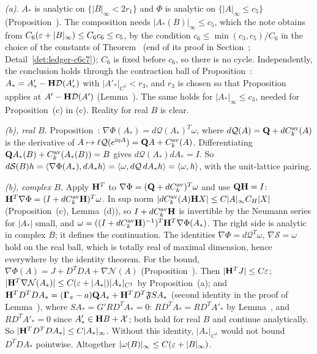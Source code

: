 \begin{detail}\label{d7:coarse}
\begin{step}
\emph{(a).} $A_*$ is analytic on $\{|B|_\infty<2r_1\}$ and $\Phi$ is analytic on $\{|A|_\infty\le c_5\}$ (Proposition~). The composition needs $|A_*(B)|_\infty\le c_5$, which the note obtains from $C_6(\varepsilon+|B|_\infty)\le C_6c_6\le c_5$, by the condition $c_6\le\min(c_3,c_5)/C_6$ in the choice of the constants of Theorem~ (end of its proof in Section~; Detail~\ref{det:ledger-c6c7}); $C_6$ is fixed before $c_6$, so there is no cycle. Independently, the conclusion holds through the contraction ball of Proposition~: $A_*=A'_*-\mathbf H\mathcal D(A'_*)$ with $|A'_*|_{C^1}<r_3$, and $r_3$ is chosen so that Proposition~ applies at $A'-\mathbf H\mathcal D(A')$ (Lemma~). The same holds for $|A_*|_\infty\le c_3$, needed for Proposition~(c) in (c). Reality for real $B$ is clear.
\end{step}
\begin{step}
\emph{(b), real $B$.} Proposition~: $\nabla\Phi(A_*)=d\mathcal Q(A_*)^T\omega$, where $d\mathcal Q(A)=\mathbf Q+dC^{\rm av}_k(A)$ is the derivative of $A\mapsto\ell\mathcal Q(e^{\mathrm i\eta A})=\mathbf Q A+C^{\rm av}_k(A)$. Differentiating $\mathbf Q A_*(B)+C^{\rm av}_k(A_*(B))=B$ gives $d\mathcal Q(A_*)dA_*=I$. So $d\mathcal S(B)h=\langle \nabla\Phi(A_*),dA_*h\rangle=\langle \omega,d\mathcal Q\,dA_*h\rangle=\langle \omega,h\rangle$, with the unit-lattice pairing.
\end{step}
\begin{step}
\emph{(b), complex $B$.} Apply $\mathbf H^T$ to $\nabla\Phi=(\mathbf Q+dC^{\rm av}_k)^T\omega$ and use $\mathbf Q\mathbf H=I$: $\mathbf H^T\nabla\Phi=(I+dC^{\rm av}_k\mathbf H)^T\omega$. In sup norm $|dC^{\rm av}_k(A)\mathbf H X|\le C|A|_\infty C_H|X|$ (Proposition~(c), Lemma~(d)), so $I+dC^{\rm av}_k\mathbf H$ is invertible by the Neumann series for $|A_*|$ small, and $\omega=((I+dC^{\rm av}_k\mathbf H)^{-1})^T\mathbf H^T\nabla\Phi(A_*)$. The right side is analytic in complex $B$; it defines the continuation. The identities $\nabla\Phi=d\mathcal Q^T\omega$, $\nabla\mathcal S=\omega$ hold on the real ball, which is totally real of maximal dimension, hence everywhere by the identity theorem. For the bound, $\nabla\Phi(A)=J+D^TDA+\nabla\mathcal N(A)$ (Proposition~). Then $|\mathbf H^TJ|\le C\varepsilon$; $|\mathbf H^T\nabla\mathcal N(A_*)|\le C(\varepsilon+|A_*|)|A_*|_{C^1}$ by Proposition~(a); and $\mathbf H^TD^TDA_*=(\boldsymbol\Gamma_\pi-a)\mathbf Q A_*+\mathbf H^TD^T\mathfrak FSA_*$ (second identity in the proof of Lemma~), where $SA_*=G'RD^TA_*=0$: $RD^TA_*=RD^TA'_*$ by Lemma~, and $RD^TA'_*=0$ since $A'_*\in\mathbf H B+\mathcal X$; both hold for real $B$ and continue analytically. So $|\mathbf H^TD^TDA_*|\le C|A_*|_\infty$. Without this identity, $|A_*|_{C^1}$ would not bound $D^TDA_*$ pointwise. Altogether $|\omega(B)|_\infty\le C(\varepsilon+|B|_\infty)$.

\end{step}
\end{detail}
